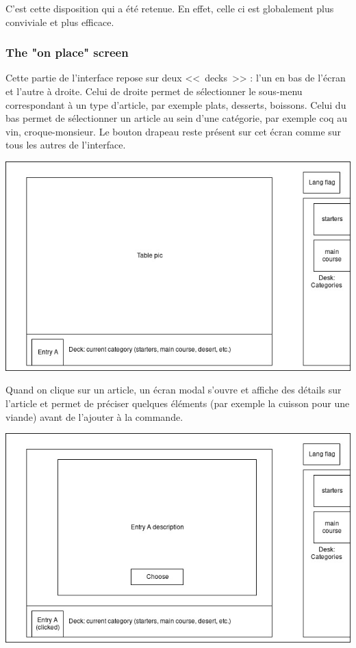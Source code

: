 \documentclass[a4paper,12pt]{article}
\begin{document}
C'est cette disposition qui a été retenue. En effet, celle ci est globalement plus conviviale et plus efficace.

\subsubsection{The "on place" screen}

Cette partie de l'interface repose sur deux <<~decks~>> : l'un en bas de l'écran et l'autre à droite. Celui de droite
permet de sélectionner le sous-menu correspondant à un type d'article, par exemple plats, desserts, boissons. Celui
du bas permet de sélectionner un article au sein d'une catégorie, par exemple coq au vin, croque-monsieur. Le bouton
drapeau reste présent sur cet écran comme sur tous les autres de l'interface.

\begin{center}
	\includegraphics[width=\textwidth]{in_place_screen1.jpg}
\end{center}

Quand on clique sur un article, un écran modal s'ouvre et affiche des détails sur l'article et permet de préciser
quelques éléments (par exemple la cuisson pour une viande) avant de l'ajouter à la commande.

\begin{center}
	\includegraphics[width=\textwidth]{in_place_screen2.jpg}
\end{center}
\end{document}
